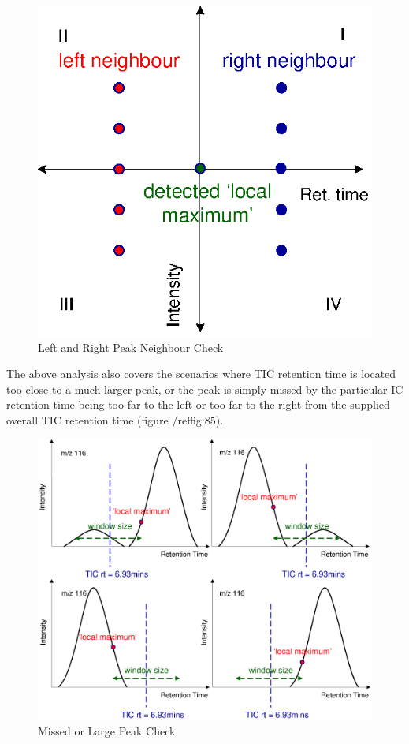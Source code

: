 \begin{figure}
  \begin{center}
    \includegraphics[scale=1]{graphics/chapter08/84.eps}
  \end{center}
  \caption{Left and Right Peak Neighbour Check}
  \label{fig:84}
\end{figure}

The above analysis also covers the scenarios where TIC retention time is located 
too close to a much larger peak, or the peak is simply missed by the particular 
IC retention time being too far to the left or too far to the right from the 
supplied overall TIC retention time (figure /ref{fig:85}).

\begin{figure}
  \begin{center}
    \includegraphics[scale=1]{graphics/chapter08/85.eps}
  \end{center}
  \caption{Missed or Large Peak Check}
  \label{fig:85}
\end{figure}

